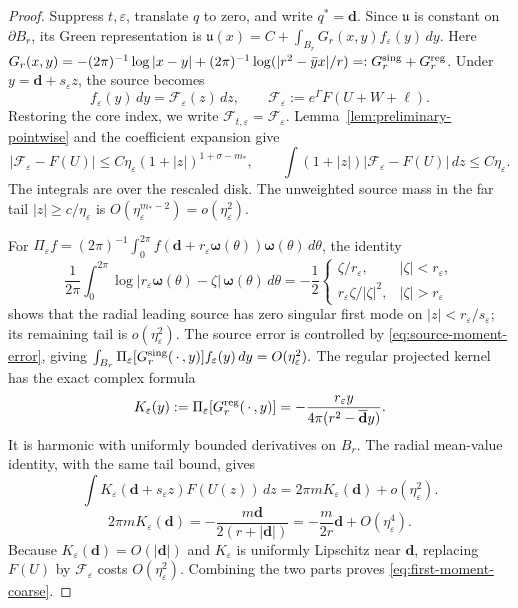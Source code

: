 \documentclass[11pt,reqno]{amsart}
\numberwithin{equation}{section}
\theoremstyle{definition}
\theoremstyle{remark}
\newcommand{\eps}{\varepsilon}
\newcommand{\etae}{\eta_{\eps}}
\begin{document}
\begin{proof}
Suppress $t,\eps$, translate $q$ to zero, and write $q^*=\mathbf{d}$. Since $\mathfrak u$
is constant on $\partial B_r$, its Green representation is
\(
 \mathfrak u(x)=C+\int_{B_r}G_r(x,y)f_\eps(y)\,dy.
\)
Here
$G_r(x,y)=-(2\pi)^{-1}\log|x-y|
 +(2\pi)^{-1}\log(|r^2-\bar yx|/r)=:G_r^{\rm sing}+G_r^{\rm reg}$.
Under $y=\mathbf{d}+s_\eps z$, the source becomes
\begin{equation}\label{eq:correct-source-change-variable}
 f_\eps(y)\,dy=\mathcal F_\eps(z)\,dz,\qquad
 \mathcal F_\eps:=e^\Gamma F(U+W+\ell).
\end{equation}
Restoring the core index, we write $\mathcal F_{t,\eps}=\mathcal F_\eps$.
Lemma~\ref{lem:preliminary-pointwise} and the coefficient expansion give
\begin{equation}\label{eq:source-moment-error}
 |\mathcal F_\eps-F(U)|\le C\etae(1+|z|)^{1+\sigma-m_*},
 \qquad
 \int(1+|z|)|\mathcal F_\eps-F(U)|\,dz\le C\etae.
\end{equation}
The integrals are over the rescaled disk. The unweighted source mass
in the far tail $|z|\ge c/\etae$ is
$O(\etae^{m_*-2})=o(\etae^2)$.

For $\Pi_\eps f=(2\pi)^{-1}
\int_0^{2\pi}f(\mathbf{d}+r_\eps \boldsymbol\omega(\theta))\boldsymbol\omega(\theta)\,d\theta$, the identity
\[
 \frac1{2\pi}\int_0^{2\pi}
 \log|r_\eps \boldsymbol\omega(\theta)-\zeta|\,\boldsymbol\omega(\theta)\,d\theta
 =-\frac12
 \begin{cases}
 \zeta/r_\eps,&|\zeta|<r_\eps,\\
 r_\eps\zeta/|\zeta|^2,&|\zeta|>r_\eps
 \end{cases}
\]
shows that the radial leading source has zero singular first mode on
$|z|<r_\eps/s_\eps$; its remaining tail is $o(\etae^2)$.
The source error is controlled by \eqref{eq:source-moment-error}, giving
\(
 \int_{B_r}\Pi_\eps[G_r^{\rm sing}(\,\cdot\,,y)]f_\eps(y)\,dy
 =O(\etae^2).
\)
The regular projected kernel has the exact complex formula
\begin{equation}\label{eq:regular-projected-kernel}
 K_\eps(y):=\Pi_\eps[G_r^{\rm reg}(\,\cdot\,,y)]
 =-\frac{r_\eps y}{4\pi(r^2-\overline{\mathbf{d}} y)}.
\end{equation}
It is harmonic with uniformly bounded derivatives on $B_r$.
The radial mean-value identity, with the same tail bound, gives
\begin{equation}\label{eq:regular-radial-reduction}
 \int K_\eps(\mathbf{d}+s_\eps z)F(U(z))\,dz
 =2\pi mK_\eps(\mathbf{d})+o(\etae^2).
\end{equation}
\begin{equation}\label{eq:regular-leading-first-mode}
 2\pi mK_\eps(\mathbf{d})=-\frac{m \mathbf{d}}{2(r+|\mathbf{d}|)}
 =-\frac{m}{2r}\mathbf{d}+O(\etae^4).
\end{equation}
Because $K_\eps(\mathbf{d})=O(|\mathbf{d}|)$ and $K_\eps$ is uniformly Lipschitz near
$\mathbf{d}$, replacing $F(U)$ by $\mathcal F_\eps$ costs $O(\etae^2)$.
Combining the two parts proves \eqref{eq:first-moment-coarse}.
\end{proof}
\end{document}
